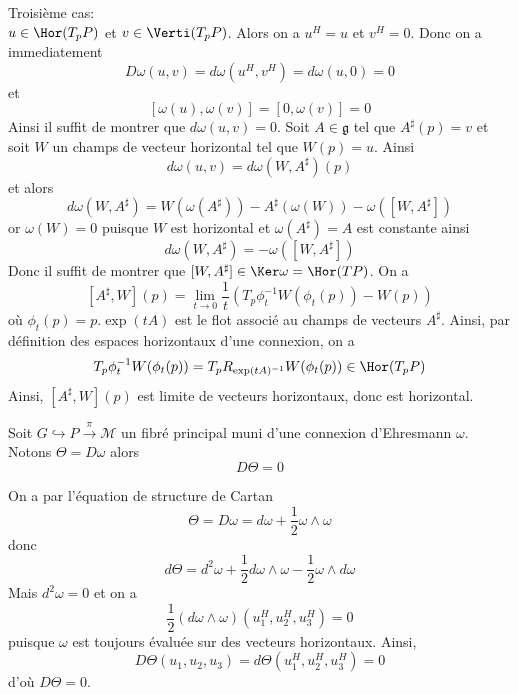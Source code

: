 \begin{preu}
Troisième cas: \\
$u\in \Hor(T_pP)$ et $v\in \Verti(T_pP)$. Alors on a $u^H = u$ et $v^H = 0$. Donc on a immediatement 
$$D\omega(u,v) = d\omega(u^H, v^H) = d\omega(u, 0) = 0$$
et 
$$[\omega(u), \omega(v)] = [0, \omega(v)] = 0$$
Ainsi il suffit de montrer que $d\omega(u, v) = 0$. Soit $A\in \mathfrak{g}$ tel que $A^\sharp(p) = v$ et soit $W$ un champs de vecteur horizontal tel que $W(p) = u$. Ainsi
$$d\omega(u,v) = d\omega(W, A^\sharp)(p)$$
et alors 
$$d\omega(W, A^\sharp) = W(\omega(A^\sharp)) - A^\sharp(\omega(W)) - \omega([W, A^\sharp])$$
or $\omega(W) = 0$ puisque $W$ est horizontal et $\omega(A^\sharp) = A$ est constante ainsi
$$d\omega(W, A^\sharp) = - \omega([W, A^\sharp])$$
Donc il suffit de montrer que $[W, A^\sharp] \in \Ker\omega = \Hor(TP)$. On a
$$[A^\sharp, W](p) = \lim_{t\to 0} \frac{1}{t}\left(T_p\phi_t^{-1}W(\phi_t(p))-W(p)\right)$$
où $\phi_t(p) = p.\exp(tA)$ est le flot associé au champs de vecteurs $A^\sharp$. Ainsi, par définition des espaces horizontaux d'une connexion, on a 
$$T_p\phi_t^{-1}W(\phi_t(p)) = T_pR_{\exp(tA)^{-1}} W(\phi_t(p)) \in \Hor(T_pP)$$
Ainsi, $[A^\sharp, W](p)$ est limite de vecteurs horizontaux, donc est horizontal.
\end{preu}

\begin{pro}
Soit $G \hookrightarrow P \overset{\pi}{\to} \mathcal{M}$ un fibré principal muni d'une connexion d'Ehresmann $\omega$. Notons $\Theta = D\omega$ alors
$$D\Theta = 0$$
\end{pro}
\begin{preu}
On a par l'équation de structure de Cartan
$$\Theta = D\omega = d\omega + \frac{1}{2}\omega \wedge \omega$$
donc 
$$d\Theta = d^2\omega + \frac{1}{2}d\omega \wedge \omega - \frac{1}{2}\omega \wedge d\omega$$
Mais $d^2\omega = 0$ et on a 
$$\frac{1}{2}(d\omega \wedge \omega)(u_1^H, u_2^H, u_3^H) = 0$$
puisque $\omega$ est toujours évaluée sur des vecteurs horizontaux.
Ainsi,
$$D\Theta(u_1, u_2, u_3) = d\Theta(u_1^H, u_2^H, u_3^H) = 0$$
d'où $D\Theta = 0$.
\end{preu}

